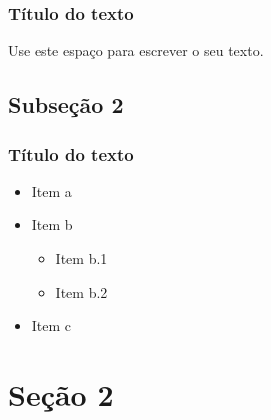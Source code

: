\documentclass[t]{beamer}
\begin{document}
\begin{frame}
\frametitle{Título do texto}
Use este espaço para escrever o seu texto.
\end{frame}

\subsection*{Subseção 2}

\begin{frame}
\frametitle{Título do texto}
\begin{itemize}
\item Item a
\item Item b
\begin{itemize}
\item Item b.1
\item Item b.2
\end{itemize}
\item Item c
\end{itemize}
\end{frame}

\section{Seção 2}
\end{document}
